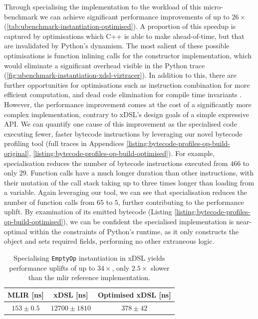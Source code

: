 Through specialising the implementation to the workload of this micro-benchmark we can achieve significant performance improvements of up to $26\times$ (\autoref{tab:ubenchmark-instantiation-optimised}). A proportion of this speedup is captured by optimisations which C++ is able to make ahead-of-time, but that are invalidated by Python's dynamism. The most salient of these possible optimisations is function inlining calls for the constructor implementation, which would eliminate a significant overhead visible in the Python trace (\autoref{fig:ubenchmark-instantiation-xdsl-viztracer}). In addition to this, there are further opportunities for optimisations such as instruction combination for more efficient computation, and dead code elimination for compile time invariants \cite{llvmprojectLLVMsAnalysisTransform}.
However, the performance improvement comes at the cost of a significantly more complex implementation, contrary to xDSL's design goals of a simple expressive API.
We can quantify one cause of this improvement as the specialised code executing fewer, faster bytecode instructions by leveraging our novel bytecode profiling tool (full traces in Appendices \ref{listing:bytecode-profiles-op-build-original}, \ref{listing:bytecode-profiles-op-build-optimised}).
For example, specialisation reduces the number of bytecode instructions executed from $466$ to only $29$. Function calls have a much longer duration than other instructions, with their mutation of the call stack taking up to three times longer than loading from a variable. Again leveraging our tool, we can see that specialisation reduces the number of function calls from $65$ to $5$, further contributing to the performance uplift.
By examination of its emitted bytecode (Listing \ref{listing:bytecode-profiles-op-build-optimised}), we can be confident the specialised implementation is near-optimal within the constraints of Python's runtime, as it only constructs the object and sets required fields, performing no other extraneous logic.

\begin{table}[H]
  \caption{Specialising \texttt{EmptyOp} instantiation in xDSL yields performance uplifts of up to $34\times$, only $2.5\times$ slower than the \ac{mlir} reference implementation.}
  \label{tab:ubenchmark-instantiation-optimised}
  \centering
  \begin{tabular}{ccc}
    \toprule
    \textbf{MLIR [ns]} & \textbf{xDSL [ns]} & \textbf{Optimised xDSL [ns]} \\
    \midrule
    $153 \pm 0.5$ & $12700 \pm 1810$ & $378 \pm 42$ \\
    \bottomrule
  \end{tabular}
\end{table}




